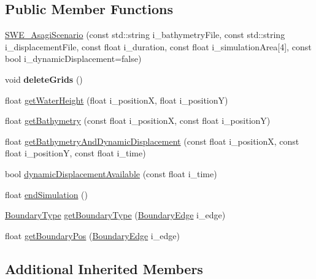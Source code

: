\subsection*{Public Member Functions}
\begin{DoxyCompactItemize}
\item 
\hyperlink{classSWE__AsagiScenario_a9add0345b6793da297a44598451074e1}{S\-W\-E\-\_\-\-Asagi\-Scenario} (const std\-::string i\-\_\-bathymetry\-File, const std\-::string i\-\_\-displacement\-File, const float i\-\_\-duration, const float i\-\_\-simulation\-Area\mbox{[}4\mbox{]}, const bool i\-\_\-dynamic\-Displacement=false)
\item 
\hypertarget{classSWE__AsagiScenario_a48d6ba2326cbc06df693990cf41144e6}{void {\bfseries delete\-Grids} ()}\label{classSWE__AsagiScenario_a48d6ba2326cbc06df693990cf41144e6}

\item 
float \hyperlink{classSWE__AsagiScenario_a3d2772883dc584cb1c8ffaafa4dafb8f}{get\-Water\-Height} (float i\-\_\-position\-X, float i\-\_\-position\-Y)
\item 
float \hyperlink{classSWE__AsagiScenario_a95456b79bd1f96120bd8efa73d927568}{get\-Bathymetry} (const float i\-\_\-position\-X, const float i\-\_\-position\-Y)
\item 
float \hyperlink{classSWE__AsagiScenario_a462a4df01aec18b2e5af37f42e86cfde}{get\-Bathymetry\-And\-Dynamic\-Displacement} (const float i\-\_\-position\-X, const float i\-\_\-position\-Y, const float i\-\_\-time)
\item 
bool \hyperlink{classSWE__AsagiScenario_ada067ab5b456f445c66b9fe84c3a4ca5}{dynamic\-Displacement\-Available} (const float i\-\_\-time)
\item 
float \hyperlink{classSWE__AsagiScenario_a44449cbcfad023f60ae2af020576fe4b}{end\-Simulation} ()
\item 
\hyperlink{SWE__Scenario_8hh_af75d5dd7322fa39ed0af4e7839e600f8}{Boundary\-Type} \hyperlink{classSWE__AsagiScenario_adf7992278300b2cb2475398245bad877}{get\-Boundary\-Type} (\hyperlink{SWE__Scenario_8hh_aa5e01e3f7df312f7b9b0d02521141fcc}{Boundary\-Edge} i\-\_\-edge)
\item 
float \hyperlink{classSWE__AsagiScenario_a1f35638db4394f05fa2d0669634aa9ca}{get\-Boundary\-Pos} (\hyperlink{SWE__Scenario_8hh_aa5e01e3f7df312f7b9b0d02521141fcc}{Boundary\-Edge} i\-\_\-edge)
\end{DoxyCompactItemize}
\subsection*{Additional Inherited Members}


